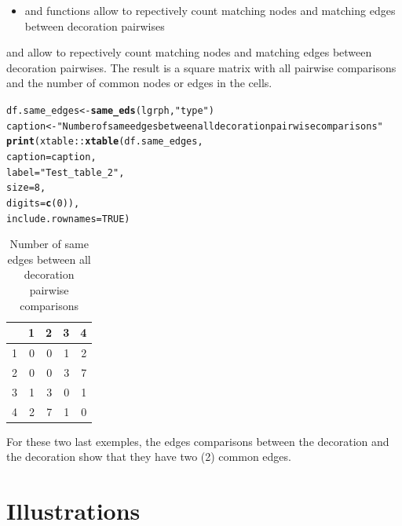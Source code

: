 \documentclass[article]{jss}\usepackage[]{graphicx}\usepackage[]{color}
\makeatletter
\newcommand{\hlnum}[1]{\textcolor[rgb]{0.686,0.059,0.569}{#1}}%
\newcommand{\hlstr}[1]{\textcolor[rgb]{0.192,0.494,0.8}{#1}}%
\newcommand{\hlopt}[1]{\textcolor[rgb]{0,0,0}{#1}}%
\newcommand{\hlstd}[1]{\textcolor[rgb]{0.345,0.345,0.345}{#1}}%
\newcommand{\hlkwb}[1]{\textcolor[rgb]{0.69,0.353,0.396}{#1}}%
\newcommand{\hlkwc}[1]{\textcolor[rgb]{0.333,0.667,0.333}{#1}}%
\newcommand{\hlkwd}[1]{\textcolor[rgb]{0.737,0.353,0.396}{\textbf{#1}}}%
\newenvironment{kframe}{%
 \def\at@end@of@kframe{}%
 \ifinner\ifhmode%
  \def\at@end@of@kframe{\end{minipage}}%
  \begin{minipage}{\columnwidth}%
 \fi\fi%
 \def\FrameCommand##1{\hskip\@totalleftmargin \hskip-\fboxsep
 \colorbox{shadecolor}{##1}\hskip-\fboxsep
     \hskip-\linewidth \hskip-\@totalleftmargin \hskip\columnwidth}%
 \MakeFramed {\advance\hsize-\width
   \@totalleftmargin\z@ \linewidth\hsize
   \@setminipage}}%
 {\par\unskip\endMakeFramed%
 \at@end@of@kframe}
\makeatother
\begin{document}
\begin{itemize}
  \item {} and  functions allow to repectively count matching nodes and matching edges between decoration pairwises
\end{itemize}

 and  allow to repectively count matching nodes and matching edges between decoration pairwises. The result is a square matrix with all pairwise comparisons and the number of common nodes or edges in the cells.

\begin{kframe}
\begin{alltt}
\hlstd{df.same_edges} \hlkwb{<-} \hlkwd{same_eds}\hlstd{(lgrph,}\hlstr{"type"}\hlstd{)}
\hlstd{caption} \hlkwb{<-} \hlstr{"Number of same edges between all decoration pairwise comparisons"}
\hlkwd{print}\hlstd{(xtable}\hlopt{::}\hlkwd{xtable}\hlstd{(df.same_edges,}
                     \hlkwc{caption}\hlstd{=caption,}
                     \hlkwc{label}\hlstd{=}\hlstr{"Test_table_2"}\hlstd{,}
                     \hlkwc{size}\hlstd{=}\hlnum{8}\hlstd{,}
                     \hlkwc{digits}\hlstd{=}\hlkwd{c}\hlstd{(}\hlnum{0}\hlstd{)),}
      \hlkwc{include.rownames}\hlstd{=}\hlnum{TRUE}\hlstd{)}
\end{alltt}
\end{kframe}%
\begin{table}[ht]
\centering
\begin{tabular}{rrrrr}
  \hline
 & 1 & 2 & 3 & 4 \\ 
  \hline
1 & 0 & 0 & 1 & 2 \\ 
  2 & 0 & 0 & 3 & 7 \\ 
  3 & 1 & 3 & 0 & 1 \\ 
  4 & 2 & 7 & 1 & 0 \\ 
   \hline
\end{tabular}
\caption{Number of same edges between all decoration pairwise comparisons} 
\label{Test_table_2}
\end{table}


For these two last exemples, the edges comparisons between the decoration  and the decoration  show that they have two (2) common edges.


\section{Illustrations} \label{sec:illustrations}
\end{document}
